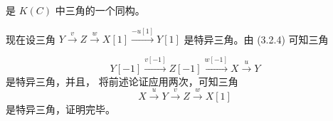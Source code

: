 是 $K(C)$ 中三角的一个同构。

现在设三角
$Y\xrightarrow{v}Z\xrightarrow{w}X[1]\xrightarrow{-u[1]}Y[1]$
是特异三角。由 (3.2.4) 可知三角

\begin{equation*}
  Y[-1]\xrightarrow{v[-1]}Z[-1]\xrightarrow{w[-1]}X
  \xrightarrow{u}Y
\end{equation*}
是特异三角，并且，
将前述论证应用两次，可知三角
\begin{equation*}
  X\xrightarrow{u}Y\xrightarrow{v}Z\xrightarrow{w}X[1]
\end{equation*}
是特异三角，证明完毕。
\endgroup
